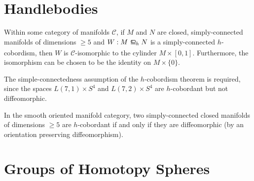 \section{Handlebodies}

\begin{theorem}[$h$-cobordism]
	Within some category of manifolds $\mathscr{C}$, if $M$ and $N$ are closed, simply-connected manifolds of dimensions $\geq 5$ and $W : M \hbord N$ is a simply-connected $h$-cobordism, then $W$ is $\mathscr{C}$-isomorphic to the cylinder $M\times [0,1]$. Furthermore, the isomorphism can be chosen to be the identity on $M\times \{0\}$.
\end{theorem}

\begin{example}
  The simple-connectedness assumption of the $h$-cobordism theorem is required, since the spaces $L(7,1)\times S^4$ and $L(7,2)\times S^4$ are $h$-cobordant but not diffeomorphic.
\end{example}

\begin{corollary}\label{thm:h-cobordism-diffeomorphism}
	In the smooth oriented manifold category, two simply-connected closed manifolds of dimensions $\geq 5$ are $h$-cobordant if and only if they are diffeomorphic (by an orientation preserving diffeomorphism).
\end{corollary}

\section{Groups of Homotopy Spheres}\label{sec:groups-of-homotopy-spheres}

